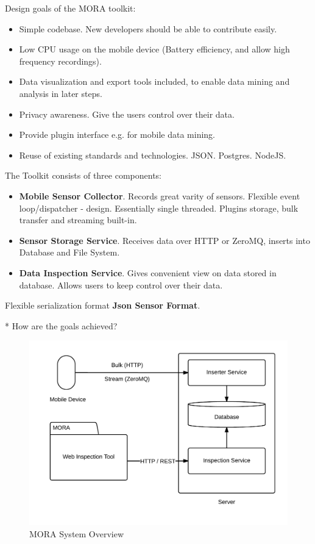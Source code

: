 \documentclass[times, 10pt,twocolumn]{article}
\begin{document}
Design goals of the MORA toolkit:
\begin{itemize}
\item Simple codebase. New developers should be able to contribute easily.
\item Low CPU usage on the mobile device (Battery efficiency, and allow high frequency recordings).
\item Data visualization and export tools included, to enable data mining and analysis in later steps.
\item Privacy awareness. Give the users control over their data.
\item Provide plugin interface e.g. for mobile data mining.
\item Reuse of existing standards and technologies. JSON. Postgres. NodeJS.
\end{itemize}

The Toolkit consists of three components:
\begin{itemize}
\item \textbf{Mobile Sensor Collector}.  Records great varity of
  sensors. Flexible event loop/dispatcher - design. Essentially single
  threaded. Plugins storage, bulk transfer and streaming built-in.
\item \textbf{Sensor Storage Service}.
  Receives data over HTTP or ZeroMQ, inserts into Database and File System.
\item \textbf{Data Inspection Service}.  Gives convenient view on data
  stored in database. Allows users to keep control over their data.
\end{itemize}

Flexible serialization format {\bf Json Sensor Format}.

* How are the goals achieved?

\begin{figure}[h]
\includegraphics[width=\linewidth]{img/system_overview.png}
\caption{MORA System Overview}
\label{overview}
\end{figure}
\end{document}
